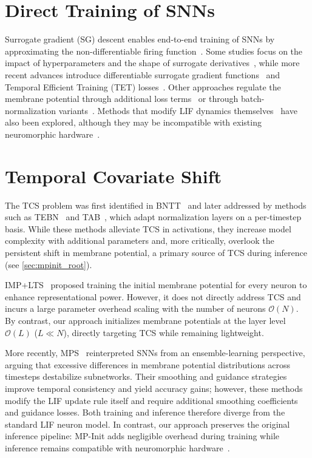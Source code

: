 \section{Direct Training of SNNs}
\label{sec:bg_direct}

Surrogate gradient (SG) descent enables end-to-end training of SNNs by approximating the non-differentiable firing function~\cite{lee:2016, wu:2018, wu:2019}. Some studies focus on the impact of hyperparameters and the shape of surrogate derivatives~\cite{zenke:2021, li:2021}, while more recent advances introduce differentiable surrogate gradient functions~\cite{li:2021} and Temporal Efficient Training (TET) losses~\cite{deng:2022}. Other approaches regulate the membrane potential through additional loss terms~\cite{guo:2022, guo:2023} or through batch-normalization variants~\cite{guo:2023_2}. Methods that modify LIF dynamics themselves~\cite{fang:2023, yao:2022, huang:2024} have also been explored, although they may be incompatible with existing neuromorphic hardware~\cite{hunsberger:2015, review_guo:2023}.

\section{Temporal Covariate Shift}
\label{sec:bg_tcs}

The TCS problem was first identified in BNTT~\cite{bntt:2020} and later addressed by methods such as TEBN~\cite{tebn:2022} and TAB~\cite{tab:2024}, which adapt normalization layers on a per-timestep basis. While these methods alleviate TCS in activations, they increase model complexity with additional parameters and, more critically, overlook the persistent shift in membrane potential, a primary source of TCS during inference (see \cref{sec:mpinit_root}).

IMP+LTS~\cite{shen:2024} proposed training the initial membrane potential for every neuron to enhance representational power. However, it does not directly address TCS and incurs a large parameter overhead scaling with the number of neurons $\mathcal{O}(N)$. By contrast, our approach initializes membrane potentials at the layer level $\mathcal{O}(L)$ ($L \ll N$), directly targeting TCS while remaining lightweight.

More recently, MPS~\cite{ding:2025} reinterpreted SNNs from an ensemble-learning perspective, arguing that excessive differences in membrane potential distributions across timesteps destabilize subnetworks. Their smoothing and guidance strategies improve temporal consistency and yield accuracy gains; however, these methods modify the LIF update rule itself and require additional smoothing coefficients and guidance losses. Both training and inference therefore diverge from the standard LIF neuron model. In contrast, our approach preserves the original inference pipeline: MP-Init adds negligible overhead during training while inference remains compatible with neuromorphic hardware~\cite{davies:2018}.

